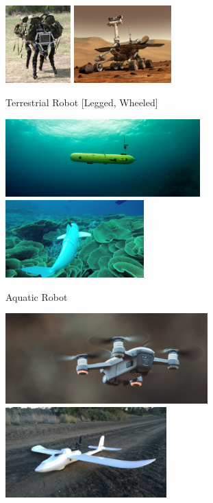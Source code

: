 \begin{spacing}{2}
\begin{figure}[h]
\begin{subfigure}{0.5\textwidth}
\includegraphics[width=0.45\linewidth, height=3cm]{image/quadraped.jpg} \includegraphics[width=0.45\linewidth, height=3cm]{image/rover.jpg}
\caption{Terrestrial Robot [Legged, Wheeled]}
\end{subfigure}
\begin{subfigure}{0.5\textwidth}
\includegraphics[width=0.45\linewidth, height=3cm, trim= 100 50 100 50,clip]{image/auv.jpg}
\includegraphics[width=0.45\linewidth, height=3cm, trim= 20 0 50 10,clip]{image/softfish.jpg}
\caption{Aquatic Robot}
\end{subfigure}
\begin{subfigure}{\textwidth}
\includegraphics[width=0.23\linewidth, height=3.5cm, trim= 100 10 20 20,clip]{image/quad.jpg} \includegraphics[width=0.23\linewidth, height=3.5cm, trim= 10 40 5 50,clip]{image/fixedwing.jpg}

\end{subfigure}
\end{figure}
\end{spacing}
